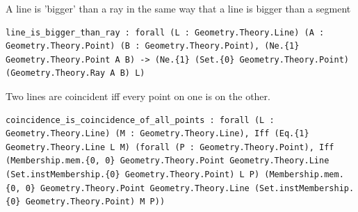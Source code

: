 \begin{theorem}
  \label{Geometry.Theory.Line.line_is_bigger_than_ray}
  \leanok
  A line is 'bigger' than a ray in the same way that a line is bigger than a segment 
\begin{verbatim}line_is_bigger_than_ray : forall (L : Geometry.Theory.Line) (A : Geometry.Theory.Point) (B : Geometry.Theory.Point), (Ne.{1} Geometry.Theory.Point A B) -> (Ne.{1} (Set.{0} Geometry.Theory.Point) (Geometry.Theory.Ray A B) L)\end{verbatim}
\end{theorem}

\begin{theorem}
  \label{Geometry.Theory.Line.coincidence_is_coincidence_of_all_points}
  \leanok
  Two lines are coincident iff every point on one is on the other. 
\begin{verbatim}coincidence_is_coincidence_of_all_points : forall (L : Geometry.Theory.Line) (M : Geometry.Theory.Line), Iff (Eq.{1} Geometry.Theory.Line L M) (forall (P : Geometry.Theory.Point), Iff (Membership.mem.{0, 0} Geometry.Theory.Point Geometry.Theory.Line (Set.instMembership.{0} Geometry.Theory.Point) L P) (Membership.mem.{0, 0} Geometry.Theory.Point Geometry.Theory.Line (Set.instMembership.{0} Geometry.Theory.Point) M P))\end{verbatim}
\end{theorem}

